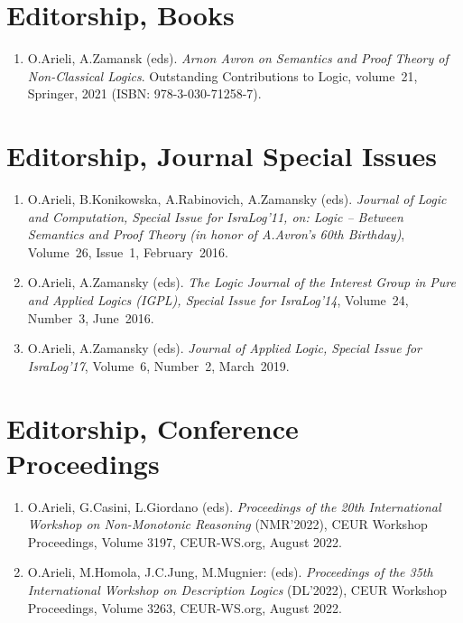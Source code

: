 \documentclass{article}
\begin{document}
\section*{Editorship, Books}

\begin{enumerate}

   \item O.Arieli, A.Zamansk (eds). {\em Arnon Avron on Semantics and Proof Theory of Non-Classical Logics\/}.
           Outstanding Contributions to Logic, volume~21, Springer, 2021 (ISBN: 978-3-030-71258-7).

\end{enumerate}


\section*{Editorship, Journal Special Issues}

\begin{enumerate}

   \item O.Arieli, B.Konikowska, A.Rabinovich, A.Zamansky (eds).
         {\em Journal of Logic and Computation, Special Issue for IsraLog'11, on: Logic -- Between Semantics
         and Proof Theory (in honor of A.Avron's  60th Birthday)\/}, Volume~26, Issue~1,
         February~2016.

   \item O.Arieli, A.Zamansky (eds).
         {\em The Logic Journal of the Interest Group in Pure and Applied Logics
         {\rm (IGPL)}, Special Issue for IsraLog'14\/}, Volume~24, Number~3, June~2016.

   \item O.Arieli, A.Zamansky (eds).
         {\em Journal of Applied Logic, Special Issue for IsraLog'17\/}, Volume~6, Number~2, March~2019.

\end{enumerate}


\section*{Editorship, Conference Proceedings}

\begin{enumerate}

   \item O.Arieli, G.Casini, L.Giordano (eds).
           {\em Proceedings of the 20th International Workshop on Non-Monotonic Reasoning\/} (NMR'2022),
            CEUR Workshop Proceedings, Volume 3197, CEUR-WS.org, August 2022.

   \item O.Arieli, M.Homola, J.C.Jung, M.Mugnier: (eds).
           {\em Proceedings of the 35th International Workshop on Description Logics\/} (DL'2022),
            CEUR Workshop Proceedings, Volume 3263, CEUR-WS.org, August 2022.

\end{enumerate}
\end{document}
